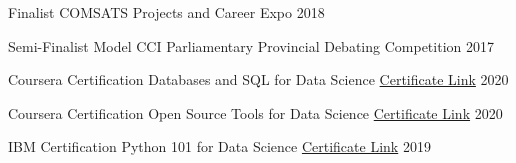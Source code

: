 



\begin{cvhonors}

  \cvhonor
    {Finalist} %
    {COMSATS Projects and Career Expo} %
    {} %
    {2018} %

  \cvhonor
    {Semi-Finalist} %
    {Model CCI Parliamentary Provincial Debating Competition} %
    {} %
    {2017} %



\end{cvhonors}




\begin{cvhonors}

  \cvhonor
    {Coursera Certification} %
    {Databases and SQL for Data Science} %
    {\href{https://www.credly.com/badges/bf9dba1d-1860-4103-ab7a-5fda3c5acc7f/linked_in_profile}{Certificate Link}} %
    {2020} %

  \cvhonor
    {Coursera Certification} %
    {Open Source Tools for Data Science} %
    {\href{https://www.coursera.org/account/accomplishments/certificate/9JBVP4GJK6K7}{Certificate Link}} %
    {2020} %

  \cvhonor
    {IBM Certification} %
    {Python 101 for Data Science} %
    {\href{https://courses.cognitiveclass.ai/certificates/86d0acfeea524127a6b6f5fb030cb74a}{Certificate Link}} %
    {2019} %

\end{cvhonors}
